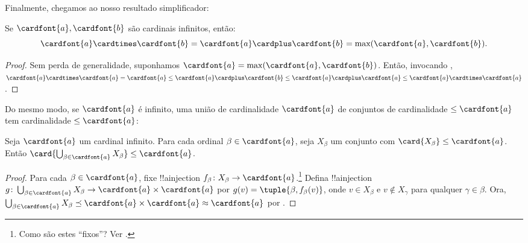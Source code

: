 \documentclass[../../../include/open-logic-section]{subfiles}
\begin{document}
Finalmente, chegamos ao nosso resultado simplificador:

\begin{thm}
Se $\cardfont{a}, \cardfont{b}$ são cardinais infinitos, então:
\[
	\cardfont{a}
\cardtimes \cardfont{b} = \cardfont{a} \cardplus \cardfont{b} =
\text{max}(\cardfont{a}, \cardfont{b}).
\]
\end{thm}

\begin{proof}
Sem perda de generalidade, suponhamos $\cardfont{a} = \max(\cardfont{a},
\cardfont{b})$. Então, invocando ,
$\cardfont{a}\cardtimes\cardfont{a} = \cardfont{a} \leq \cardfont{a}
\cardplus \cardfont{b} \leq \cardfont{a} \cardplus \cardfont{a} \leq
\cardfont{a} \cardtimes \cardfont{a}$. \end{proof}\noindent Do mesmo modo,
se $\cardfont{a}$ é infinito, uma união de cardinalidade $\cardfont{a}$ de
conjuntos de cardinalidade $\leq\cardfont{a}$ tem cardinalidade $\leq\cardfont{a}$:

\begin{prop}
Seja $\cardfont{a}$ um cardinal infinito. Para cada ordinal $\beta
\in \cardfont{a}$, seja $X_\beta$ um conjunto com $\card{X_\beta} \leq
\cardfont{a}$. Então $\card{\bigcup_{\beta \in \cardfont{a}} X_\beta}
\leq \cardfont{a}$.
\end{prop}

\begin{proof}
Para cada $\beta \in \cardfont{a}$, fixe !!a{injection} $f_\beta \colon
X_\beta \to \cardfont{a}$.\footnote{Como são estes ``fixos''? Ver .} Defina !!a{injection} $g \colon
\bigcup_{\beta \in \cardfont{a}} X_\beta \to \cardfont{a} \times
\cardfont{a}$ por $g(v) = \tuple{\beta, f_\beta(v)}$, onde $v \in
X_\beta$ e $v \notin X_\gamma$ para qualquer $\gamma \in \beta$. Ora,
$\bigcup_{\beta \in \cardfont{a}} X_\beta \preceq \cardfont{a} \times
\cardfont{a} \approx \cardfont{a}$ por .
\end{proof}
\end{document}
